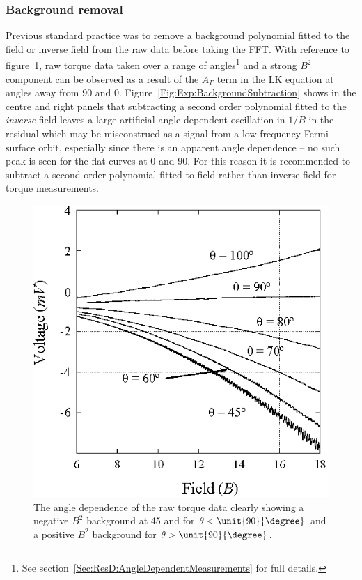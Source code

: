 \subsubsection{Background removal}

Previous standard practice was to remove a background polynomial fitted to the field or inverse field from the raw data before taking the \ac{FFT}. With reference to figure~\ref{Fig:Exp:RawPlotAngleDependence}, raw torque data taken over a range of angles\footnote{See section~\ref{Sec:ResD:AngleDependentMeasurements} for full details.} and a strong $B^2$ component can be observed as a result of the $A_{\Gamma}$ term in the \ac{LK} equation at angles away from \unit{90}{\degree} and \unit{0}{\degree}. Figure~\ref{Fig:Exp:BackgroundSubtraction} shows in the centre and right panels that subtracting a second order polynomial fitted to the \emph{inverse} field leaves a large artificial angle-dependent oscillation in $1/B$ in the residual which may be misconstrued as a signal from a low frequency Fermi surface orbit, especially since there is an apparent angle dependence -- no such peak is seen for the flat curves at \unit{0}{\degree} and \unit{90}{\degree}. For this reason it is recommended to subtract a second order polynomial fitted to field rather than inverse field for torque measurements.
\begin{figure}[htbp]
    \begin{center}
        \includegraphics[scale=1.1]{Chapter-ExperimentalTechnique/Figures/ComparisonBackgroundSubtraction/RawPlotAngleDependence}
        \caption{The angle dependence of the raw torque data clearly showing a negative $B^2$ background at \unit{45}{\degree} and for $\theta<\unit{90}{\degree}$ and a positive $B^2$ background for $\theta>\unit{90}{\degree}$.}
        \label{Fig:Exp:RawPlotAngleDependence}
    \end{center}
\end{figure}
